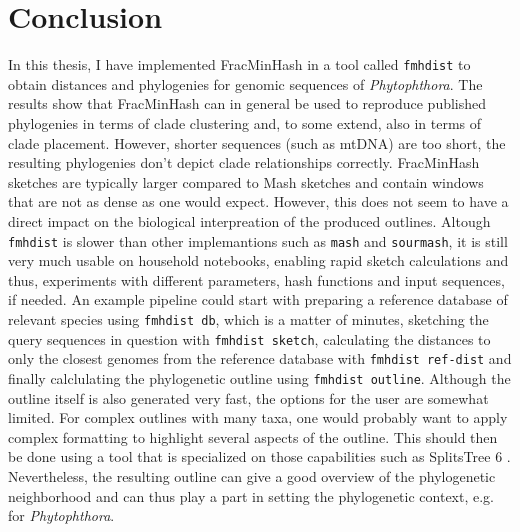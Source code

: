 \chapter{Conclusion}
In this thesis, I have implemented FracMinHash in a tool called \texttt{fmhdist}
to obtain distances and phylogenies for genomic sequences of
\textit{Phytophthora}. The results show that FracMinHash can in general be used
to reproduce published phylogenies in terms of clade clustering and, to some
extend, also in terms of clade placement. However, shorter sequences (such as
mtDNA) are too short, the resulting phylogenies don't depict clade relationships
correctly. FracMinHash sketches are typically larger compared to Mash sketches
and contain windows that are not as dense as one would expect. However, this
does not seem to have a direct impact on the biological interpreation of the
produced outlines.  
Altough \texttt{fmhdist} is slower than other implemantions such as
\texttt{mash} and \texttt{sourmash}, it is still very much usable on household
notebooks, enabling rapid sketch calculations and thus, experiments with
different parameters, hash functions and input sequences, if needed. An example
pipeline could start with preparing a reference database of relevant species
using \texttt{fmhdist db}, which is a matter of minutes, sketching the query
sequences in question with \texttt{fmhdist sketch}, calculating the distances to
only the closest genomes from the reference database with \texttt{fmhdist
ref-dist} and finally calclulating the phylogenetic outline using
\texttt{fmhdist outline}. Although the outline itself is also generated very
fast, the options for the user are somewhat limited. For complex outlines with
many taxa, one would probably want to apply complex formatting to highlight
several aspects of the outline. This should then be done using a tool that is
specialized on those capabilities such as SplitsTree 6
\cite{husonApplicationPhylogeneticNetworks2006}. Nevertheless, the resulting
outline can give a good overview of the phylogenetic neighborhood and can thus
play a part in setting the phylogenetic context, e.g. for \textit{Phytophthora}.